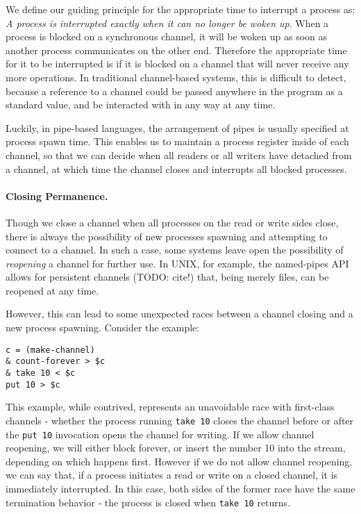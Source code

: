 \documentclass[format=sigconf, review=true, draft=true, screen=true]{acmart}
\begin{document}
We define our guiding principle for the appropriate time to interrupt a process as: \emph{A process is interrupted exactly when it can no longer be woken up}.
When a process is blocked on a synchronous channel, it will be woken up as soon as another process communicates on the other end.
Therefore the appropriate time for it to be interrupted is if it is blocked on a channel that will never receive any more operations.
In traditional channel-based systems, this is difficult to detect, because a reference to a channel could be passed anywhere in the program as a standard value, and be interacted with in any way at any time.

Luckily, in pipe-based languages, the arrangement of pipes is usually specified at process spawn time. This enables us to maintain a process register inside of each channel, so that we can decide when all readers or all writers have detached from a channel, at which time the channel closes and interrupts all blocked processes.

\paragraph{Closing Permanence.}
Though we close a channel when all processes on the read or write sides close, there is always the possibility of new processes spawning and attempting to connect to a channel. In such a case, some systems leave open the possibility of \emph{reopening} a channel for further use. In UNIX, for example, the named-pipes API allows for persistent channels (TODO: cite!) that, being merely files, can be reopened at any time.

However, this can lead to some unexpected races between a channel closing and a new process spawning. Consider the example:

\begin{lstlisting}
c = (make-channel)
& count-forever > $c
& take 10 < $c
put 10 > $c
\end{lstlisting}

This example, while contrived, represents an unavoidable race with first-class channels - whether the process running \verb/take 10/ closes the channel before or
after the \verb/put 10/ invocation opens the channel for writing. If we allow channel reopening, we will either block forever, or insert the number 10 into the stream, depending on which happens first. However if we do not allow channel reopening, we can say that, if a process initiates a read or write on a closed channel, it is immediately interrupted. In this case, both sides of the former race have the same termination behavior - the process is closed when \verb/take 10/ returns.
\end{document}
